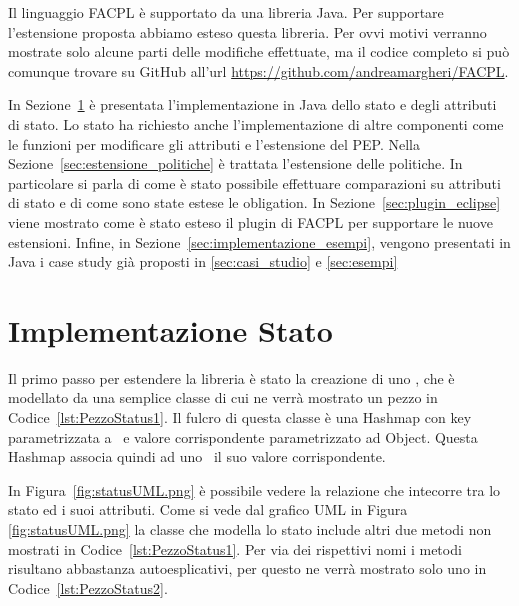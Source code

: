 \label{cap:estensione_libreria}
Il linguaggio \ac{FACPL} è supportato da una libreria Java. Per supportare l'estensione proposta
abbiamo esteso questa libreria. Per ovvi motivi verranno mostrate solo alcune parti delle modifiche effettuate, ma 
il codice completo si può comunque trovare su GitHub all'url \url{https://github.com/andreamargheri/FACPL}.\par
In Sezione~\ref{sec:imp_stato} è presentata l'implementazione in Java dello stato e degli attributi di stato. Lo stato ha richiesto anche l'implementazione di altre componenti come le funzioni per modificare gli attributi e l'estensione del \ac{PEP}.
Nella Sezione~\ref{sec:estensione_politiche} è trattata l'estensione delle politiche. In particolare si parla di come è stato possibile 
effettuare comparazioni su attributi di stato e di come sono state estese le obligation.
In Sezione~\ref{sec:plugin_eclipse} viene mostrato come è stato esteso il plugin di \ac{FACPL} per supportare le nuove estensioni.
Infine, in Sezione~\ref{sec:implementazione_esempi}, vengono presentati in Java i case study già proposti in \ref{sec:casi_studio} e
\ref{sec:esempi}
\section{Implementazione Stato}
\label{sec:imp_stato}
Il primo passo per estendere la libreria è stato la creazione di uno \status, che è modellato da una semplice classe 
di cui ne verrà mostrato un pezzo in Codice~\ref{lst:PezzoStatus1}. Il fulcro di questa classe è una Hashmap con key parametrizzata a 
\statusattribute \ e valore corrispondente parametrizzato ad Object. Questa Hashmap associa quindi ad uno \statusattribute\ il suo valore corrispondente.

In Figura~\ref{fig:statusUML.png} è possibile vedere la relazione che intecorre tra lo stato ed i suoi attributi. 
Come si vede dal grafico UML in Figura \ref{fig:statusUML.png} la classe che modella lo stato include altri due metodi non mostrati in Codice~\ref{lst:PezzoStatus1}. Per via dei rispettivi nomi i metodi risultano abbastanza autoesplicativi, per questo ne verrà mostrato solo uno in Codice~\ref{lst:PezzoStatus2}.

